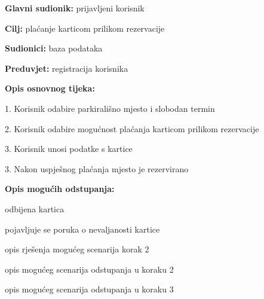 					\noindent {}
					\begin{packed_item}
						
						\item \textbf{Glavni sudionik: }prijavljeni korisnik
						\item  \textbf{Cilj:} plaćanje karticom prilikom rezervacije
						\item  \textbf{Sudionici:} baza podataka
						\item  \textbf{Preduvjet:} registracija korisnika
						\item  \textbf{Opis osnovnog tijeka:}
						
						\item[] \begin{packed_enum}
							
							\item 1. Korisnik odabire parkirališno mjesto i slobodan termin
							\item 2. Korisnik odabire mogućnost plaćanja karticom prilikom rezervacije
							\item 3. Korisnik unosi podatke s kartice
							\item 3. Nakon uspješnog plaćanja mjesto je rezervirano
						\end{packed_enum}
						
						\item  \textbf{Opis mogućih odstupanja:}
						
						\item[] \begin{packed_item}
							
							\item[2.a] odbijena kartica
							\item[] \begin{packed_enum}
								
								\item pojavljuje se poruka o nevaljanosti kartice
								\item opis rješenja mogućeg scenarija korak 2
								
							\end{packed_enum}
							\item[2.b] opis mogućeg scenarija odstupanja u koraku 2
							\item[3.a] opis mogućeg scenarija odstupanja  u koraku 3
							
						\end{packed_item}
					\end{packed_item}
					

